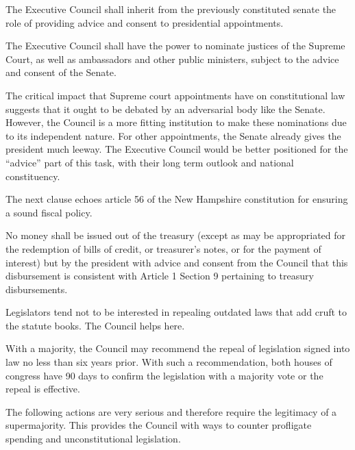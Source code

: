 \documentclass{article}
\newcommand{\quotes}[1]{``#1''}
\begin{document}
\begin{quoting}
The Executive Council shall inherit from the previously constituted senate the role of providing advice and consent to presidential appointments.

The Executive Council shall have the power to nominate justices of the Supreme Court, as well as ambassadors and other public ministers, subject to the advice and consent of the Senate.
\end{quoting}

The critical impact that Supreme court appointments have on constitutional law suggests that it ought to be debated by an adversarial body like the Senate. However, the Council is a more fitting institution to make these nominations due to its independent nature. For other appointments, the Senate already gives the president much leeway. The Executive Council would be better positioned for the \quotes{advice} part of this task, with their long term outlook and national constituency.

The next clause echoes article 56 of the New Hampshire constitution\cite{New Hampshire Constitution} for ensuring a sound fiscal policy.

\begin{quoting}
No money shall be issued out of the treasury (except as may be appropriated for the redemption of bills of credit, or treasurer's notes, or for the payment of interest) but by the president with advice and consent from the Council that this disbursement is consistent with Article 1 Section 9 pertaining to treasury disbursements.
\end{quoting}

Legislators tend not to be interested in repealing outdated laws that add cruft to the statute books. The Council helps here. 

\begin{quoting}
With a majority, the Council may recommend the repeal of legislation signed into law no less than six years prior. With such a recommendation, both houses of congress have 90 days to confirm the legislation with a majority vote or the repeal is effective.
\end{quoting}

The following actions are very serious and therefore require the legitimacy of a supermajority. This provides the Council with ways to counter profligate spending and unconstitutional legislation.
\end{document}

